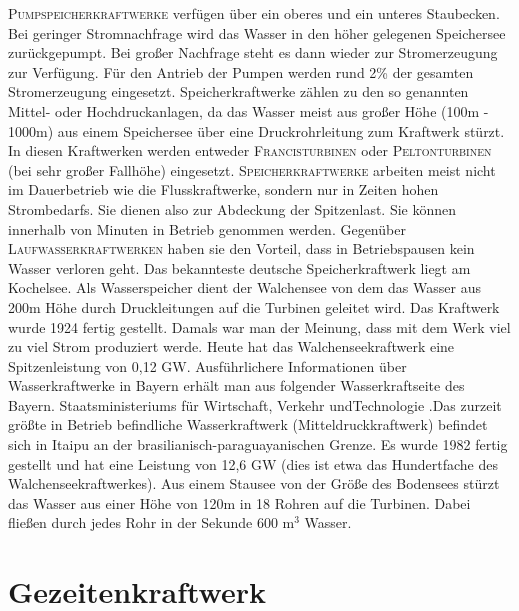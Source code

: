\documentclass[12pt]{scrbook}
\begin{document}
\textsc{Pumpspeicherkraftwerke} verfügen über ein oberes und ein unteres Staubecken.
Bei geringer Stromnachfrage wird das Wasser in den höher gelegenen Speichersee
zurückgepumpt. Bei großer Nachfrage steht es dann wieder zur Stromerzeugung
zur Verfügung. Für den Antrieb der Pumpen werden rund 2\% der gesamten
Stromerzeugung eingesetzt. Speicherkraftwerke zählen zu den so genannten
Mittel- oder Hochdruckanlagen, da das Wasser meist aus großer Höhe (100m -
1000m) aus einem Speichersee über eine Druckrohrleitung zum Kraftwerk stürzt.
In diesen Kraftwerken werden entweder \textsc{Francisturbinen} oder \textsc{Peltonturbinen} (bei
sehr großer Fallhöhe) eingesetzt. \textsc{Speicherkraftwerke} arbeiten meist nicht im
Dauerbetrieb wie die Flusskraftwerke, sondern nur in Zeiten hohen
Strombedarfs. Sie dienen also zur Abdeckung der Spitzenlast. Sie können
innerhalb von Minuten in Betrieb genommen werden. Gegenüber
\textsc{Laufwasserkraftwerken} haben sie den Vorteil, dass in Betriebspausen kein
Wasser verloren geht. Das bekannteste deutsche Speicherkraftwerk liegt am
Kochelsee. Als Wasserspeicher dient der Walchensee von dem das Wasser aus 200m
Höhe durch Druckleitungen auf die Turbinen geleitet wird. Das Kraftwerk wurde
1924 fertig gestellt. Damals war man der Meinung, dass mit dem Werk viel zu
viel Strom produziert werde. Heute hat das Walchenseekraftwerk eine
Spitzenleistung von 0,12 GW. Ausführlichere Informationen über
Wasserkraftwerke in Bayern erhält man aus folgender Wasserkraftseite des
Bayern. Staatsministeriums für Wirtschaft, Verkehr undTechnologie .Das zurzeit
größte in Betrieb befindliche Wasserkraftwerk (Mitteldruckkraftwerk) befindet
sich in Itaipu an der brasilianisch-paraguayanischen Grenze. Es wurde 1982
fertig gestellt und hat eine Leistung von 12,6 GW (dies ist etwa das
Hundertfache des Walchenseekraftwerkes). Aus einem Stausee von der Größe des
Bodensees stürzt das Wasser aus einer Höhe von 120m in 18 Rohren auf die
Turbinen. Dabei fließen durch jedes Rohr in der Sekunde 600 m$^3$ Wasser.

\newpage

\section{Gezeitenkraftwerk}
\end{document}
